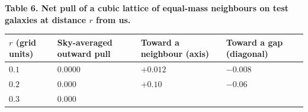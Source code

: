 \documentclass[
]{article}
\begin{document}
\textbf{Table 6. Net pull of a cubic lattice of equal-mass neighbours on
test galaxies at distance \(r\) from us.}

\begin{longtable}[]{@{}llll@{}}
\toprule
\begin{minipage}[b]{0.22\columnwidth}\raggedright
\(r\) (grid units)\strut
\end{minipage} & \begin{minipage}[b]{0.22\columnwidth}\raggedright
Sky-averaged outward pull\strut
\end{minipage} & \begin{minipage}[b]{0.22\columnwidth}\raggedright
Toward a neighbour (axis)\strut
\end{minipage} & \begin{minipage}[b]{0.22\columnwidth}\raggedright
Toward a gap (diagonal)\strut
\end{minipage}\tabularnewline
\midrule
\endhead
\begin{minipage}[t]{0.22\columnwidth}\raggedright
\(0.1\)\strut
\end{minipage} & \begin{minipage}[t]{0.22\columnwidth}\raggedright
\(0.0000\)\strut
\end{minipage} & \begin{minipage}[t]{0.22\columnwidth}\raggedright
\(+0.012\)\strut
\end{minipage} & \begin{minipage}[t]{0.22\columnwidth}\raggedright
\(-0.008\)\strut
\end{minipage}\tabularnewline
\begin{minipage}[t]{0.22\columnwidth}\raggedright
\(0.2\)\strut
\end{minipage} & \begin{minipage}[t]{0.22\columnwidth}\raggedright
\(0.000\)\strut
\end{minipage} & \begin{minipage}[t]{0.22\columnwidth}\raggedright
\(+0.10\)\strut
\end{minipage} & \begin{minipage}[t]{0.22\columnwidth}\raggedright
\(-0.06\)\strut
\end{minipage}\tabularnewline
\begin{minipage}[t]{0.22\columnwidth}\raggedright
\(0.3\)\strut
\end{minipage} & \begin{minipage}[t]{0.22\columnwidth}\raggedright
\(0.000\)\strut
\end{minipage} & \begin{minipage}[t]{0.22\columnwidth}\raggedright

\end{minipage}
\end{longtable}
\end{document}
